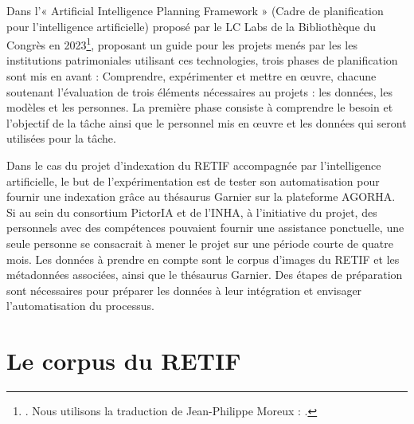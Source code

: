 Dans l’« Artificial Intelligence Planning Framework » (Cadre de planification pour l’intelligence artificielle) proposé par le LC Labs de la Bibliothèque du Congrès en 2023\footnote{\cite{libraryofcongressPlanningFrameworkUsed2025}. Nous utilisons la traduction de Jean-Philippe Moreux : \cite{libraryofcongressPlanificationProjetIA2025}.}, proposant un guide pour les projets menés par les les institutions patrimoniales utilisant ces technologies, trois phases de planification sont mis en avant : Comprendre, expérimenter et mettre en œuvre, chacune soutenant l'évaluation de trois éléments nécessaires au projets : les données, les modèles et les personnes. La première phase consiste à comprendre le besoin et l’objectif de la tâche ainsi que le personnel mis en œuvre et les données qui seront utilisées pour la tâche. 

Dans le cas du projet d’indexation du RETIF accompagnée par l’intelligence artificielle, le but de l’expérimentation est de tester son automatisation pour fournir une indexation grâce au thésaurus Garnier sur la plateforme AGORHA. Si au sein du consortium PictorIA et de l’INHA, à l’initiative du projet, des personnels avec des compétences pouvaient fournir une assistance ponctuelle, une seule personne se consacrait à mener le projet sur une période courte de quatre mois. Les données à prendre en compte sont le corpus d’images du RETIF et les métadonnées associées, ainsi que le thésaurus Garnier. Des étapes de préparation sont nécessaires pour préparer les données à leur intégration et envisager l’automatisation du processus.

\section{Le corpus du RETIF}

